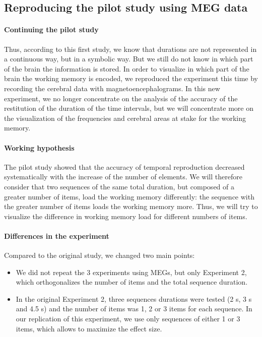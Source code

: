  
\subsection{Reproducing the pilot study using MEG data}
 
\paragraph{Continuing the pilot study}
Thus, according to this first study, we know that durations are not represented in a continuous way, but in a symbolic way. But we still do not know in which part of the brain the information is stored. In order to visualize in which part of the brain the working memory is encoded, we reproduced the experiment this time by recording the cerebral data with magnetoencephalograms. In this new experiment, we no longer concentrate on the analysis of the accuracy of the restitution of the duration of the time intervals, but we will concentrate more on the visualization of the frequencies and cerebral areas at stake for the working memory.
 
\paragraph{Working hypothesis}
The pilot study showed that the accuracy of temporal reproduction decreased systematically with the increase of the number of elements. We will therefore consider that two sequences of the same total duration, but composed of a greater number of items, load the working memory differently: the sequence with the greater number of items loads the working memory more. Thus, we will try to visualize the difference in working memory load for different numbers of items.
 
\paragraph{Differences in the experiment}
Compared to the original study, we changed two main points:
 
\begin{itemize}
   \item We did not repeat the 3 experiments using MEGs, but only Experiment 2, which orthogonalizes the number of items and the total sequence duration.
   \item In the original Experiment 2, three sequences durations were tested (2 s, 3 s and 4.5 s) and the number of items was 1, 2 or 3 items for each sequence. In our replication of this experiment, we use only sequences of either 1 or 3 items, which allows to maximize the effect size.
\end{itemize}
 
